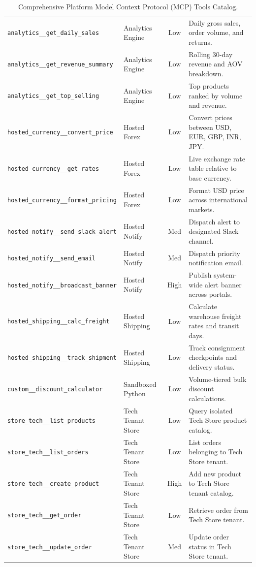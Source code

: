 \documentclass[11pt,a4paper]{article}
\begin{document}
\begin{table}[h!]
\begin{tabularx}{\textwidth}{p{4.6cm} p{2.5cm} c X}
\addlinespace
\texttt{analytics\_\_get\_daily\_sales}      & Analytics Engine & Low    & Daily gross sales, order volume, and returns. \\
\texttt{analytics\_\_get\_revenue\_summary}  & Analytics Engine & Low    & Rolling 30-day revenue and AOV breakdown. \\
\texttt{analytics\_\_get\_top\_selling}     & Analytics Engine & Low    & Top products ranked by volume and revenue. \\
\addlinespace
\texttt{hosted\_currency\_\_convert\_price}  & Hosted Forex     & Low    & Convert prices between USD, EUR, GBP, INR, JPY. \\
\texttt{hosted\_currency\_\_get\_rates}      & Hosted Forex     & Low    & Live exchange rate table relative to base currency. \\
\texttt{hosted\_currency\_\_format\_pricing} & Hosted Forex     & Low    & Format USD price across international markets. \\
\texttt{hosted\_notify\_\_send\_slack\_alert}& Hosted Notify    & Med    & Dispatch alert to designated Slack channel. \\
\texttt{hosted\_notify\_\_send\_email}       & Hosted Notify    & Med    & Dispatch priority notification email. \\
\texttt{hosted\_notify\_\_broadcast\_banner} & Hosted Notify    & High   & Publish system-wide alert banner across portals. \\
\texttt{hosted\_shipping\_\_calc\_freight}   & Hosted Shipping  & Low    & Calculate warehouse freight rates and transit days. \\
\texttt{hosted\_shipping\_\_track\_shipment} & Hosted Shipping  & Low    & Track consignment checkpoints and delivery status. \\
\texttt{custom\_\_discount\_calculator}     & Sandboxed Python & Low    & Volume-tiered bulk discount calculations. \\
\addlinespace
\texttt{store\_tech\_\_list\_products}       & Tech Tenant Store& Low    & Query isolated Tech Store product catalog. \\
\texttt{store\_tech\_\_list\_orders}         & Tech Tenant Store& Low    & List orders belonging to Tech Store tenant. \\
\texttt{store\_tech\_\_create\_product}      & Tech Tenant Store& High   & Add new product to Tech Store tenant catalog. \\
\texttt{store\_tech\_\_get\_order}           & Tech Tenant Store& Low    & Retrieve order from Tech Store tenant. \\
\texttt{store\_tech\_\_update\_order}        & Tech Tenant Store& Med    & Update order status in Tech Store tenant. \\
\bottomrule
\end{tabularx}
\caption{Comprehensive Platform Model Context Protocol (MCP) Tools Catalog.}
\label{tab:tools_catalog}
\end{table}
\end{document}
